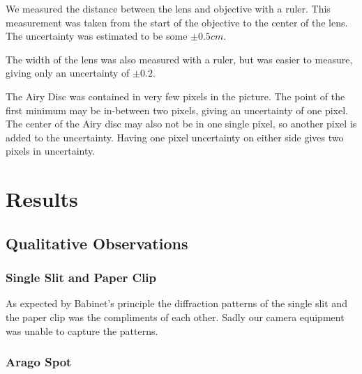 \documentclass{emulateapj}
\begin{document}
We measured the distance between the lens and objective with a ruler. This measurement was taken from the start of the objective to the center of the lens. The uncertainty was estimated to be some $\pm 0.5 cm$.

The width of the lens was also measured with a ruler, but was easier to measure, giving only an uncertainty of $\pm 0.2$.

The Airy Disc was contained in very few pixels in the picture. The point of the first minimum may be in-between two pixels, giving an uncertainty of one pixel. The center of the Airy disc may also not be in one single pixel, so another pixel is added to the uncertainty. Having one pixel uncertainty on either side gives two pixels in uncertainty.

\section{Results}
\label{sec:results}

\subsection{Qualitative Observations}

\subsubsection{Single Slit and Paper Clip}
As expected by Babinet's principle the diffraction patterns of the single slit and the paper clip was the compliments of each other. Sadly our camera equipment was unable to capture the patterns.

\subsubsection{Arago Spot}
\end{document}
